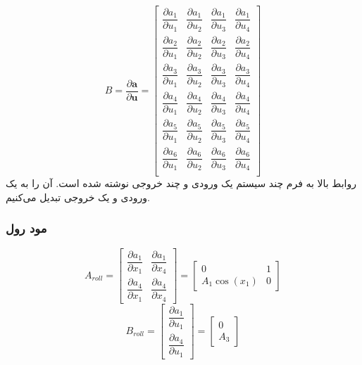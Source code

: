 \begin{equation}
	B = \dfrac{\partial \boldsymbol a}{\partial \boldsymbol u} = 
	\begin{bmatrix}
		\dfrac{\partial  a_1}{\partial  u_1}&
		\dfrac{\partial  a_1}{\partial  u_2}&
		\dfrac{\partial  a_1}{\partial  u_3}&
		\dfrac{\partial  a_1}{\partial  u_4}
		\\[1em]
		\dfrac{\partial  a_2}{\partial  u_1}&
		\dfrac{\partial  a_2}{\partial  u_2}&
		\dfrac{\partial  a_2}{\partial  u_3}&
		\dfrac{\partial  a_2}{\partial  u_4}
		\\[1em]
		\dfrac{\partial  a_3}{\partial  u_1}&
		\dfrac{\partial  a_3}{\partial  u_2}&
		\dfrac{\partial  a_3}{\partial  u_3}&
		\dfrac{\partial  a_3}{\partial  u_4}
		\\[1em]
		\dfrac{\partial  a_4}{\partial  u_1}&
		\dfrac{\partial  a_4}{\partial  u_2}&
		\dfrac{\partial  a_4}{\partial  u_3}&
		\dfrac{\partial  a_4}{\partial  u_4}
		\\[1em]
		\dfrac{\partial  a_5}{\partial  u_1}&
		\dfrac{\partial  a_5}{\partial  u_2}&
		\dfrac{\partial  a_5}{\partial  u_3}&
		\dfrac{\partial  a_5}{\partial  u_4}
		\\[1em]
		\dfrac{\partial  a_6}{\partial  u_1}&
		\dfrac{\partial  a_6}{\partial  u_2}&
		\dfrac{\partial  a_6}{\partial  u_3}&
		\dfrac{\partial  a_6}{\partial  u_4}
		\\[1em]
	\end{bmatrix}
\end{equation}
روابط بالا به فرم چند سیستم یک ورودی و چند خروجی نوشته ‌شده ‌است. آن را به یک ورودی و یک خروجی تبدیل می‌کنیم.
\subsubsection{مود رول}
\begin{equation}
	A_{roll} = \begin{bmatrix}
		\dfrac{\partial  a_1}{\partial  x_1}& \dfrac{\partial  a_1}{\partial  x_4}
		\\[1em]
		\dfrac{\partial  a_4}{\partial  x_1}& \dfrac{\partial  a_4}{\partial  x_4}
	\end{bmatrix} = 
	\begin{bmatrix}
		0 & 1\\
		A_1\cos(x_1) & 0
	\end{bmatrix}
\end{equation}
\begin{equation}
	B_{roll} = \begin{bmatrix}
		\dfrac{\partial  a_1}{\partial  u_1}
		\\[1em]
		\dfrac{\partial  a_4}{\partial  u_1}
	\end{bmatrix} = 
	\begin{bmatrix}
		0\\
		A_3
	\end{bmatrix}
\end{equation}

